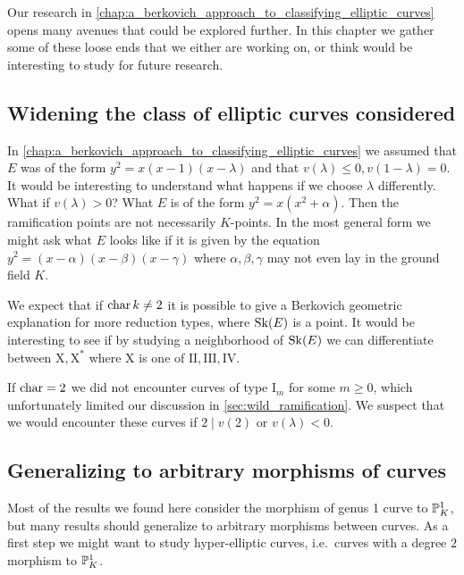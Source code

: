 Our research in \cref{chap:a_berkovich_approach_to_classifying_elliptic_curves} opens many avenues that could be explored further. 
In this chapter we gather some of these loose ends that we either are working on, or think would be interesting to study for future research. 


\subsection*{Widening the class of elliptic curves considered} \label{sec:widening_the_class_of_elliptic_curves_considered}

In \cref{chap:a_berkovich_approach_to_classifying_elliptic_curves} we assumed that $E$ was of the form $y^2 = x(x-1)(x-\lambda)$ and that $v(\lambda) \le 0, v(1-\lambda) = 0$. 
It would be interesting to understand what happens if we choose $\lambda$ differently. 
What if $v(\lambda) > 0$? 
What  $E$ is of the form $y^2 = x(x^2 + \alpha)$. Then the ramification points are not necessarily $K$-points. 
In the most general form we might ask what $E$ looks like if it is given by the equation $y^2 = (x-\alpha)(x-\beta)(x-\gamma)$ where $\alpha, \beta, \gamma$ may not even lay in the ground field $K$. 

We expect that if $\operatorname{char} k \ne 2$ it is possible to give a Berkovich geometric explanation for more reduction types, where $\operatorname{Sk}(E)$ is a point. 
It would be interesting to see if by studying a neighborhood of $\operatorname{Sk}(E)$ we can differentiate between $\mathrm {X}, \mathrm{X}^*$ where $\mathrm {X}$ is one of  $\mathrm{II}, \mathrm{III}, \mathrm{IV}$. 

If $\operatorname{char} = 2$ we did not encounter curves of type $\mathrm I_m$ for some $m \ge 0$, which unfortunately limited our discussion in \cref{sec:wild_ramification}. 
We suspect that we would encounter these curves if $2 \mid v(2)$ or $v(\lambda) < 0$. 



\subsection*{Generalizing to arbitrary morphisms of curves} \label{sec:generalizing_to_arbitrary_morphisms_of_curves}

Most of the results we found here consider the morphism of genus 1 curve to $\mathbb{P}^{1}_K$, but many results should generalize to arbitrary morphisms between curves. 
As a first step we might want to study hyper-elliptic curves, i.e.\ curves with a degree $2$ morphism to $\mathbb{P}^{1}_K$.

